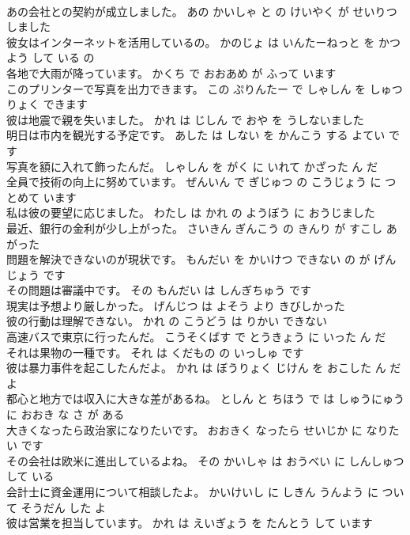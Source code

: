 \documentclass[8pt]{extreport}
\begin{document}
\begin{CJK}{UTF8}{min}
\\	あの会社との契約が成立しました。	あの かいしゃ と の けいやく が せいりつ しました 
\\	彼女はインターネットを活用しているの。	かのじょ は いんたーねっと を かつよう して いる の 
\\	各地で大雨が降っています。	かくち で おおあめ が ふって います 
\\	このプリンターで写真を出力できます。	この ぷりんたー で しゃしん を しゅつりょく できます 
\\	彼は地震で親を失いました。	かれ は じしん で おや を うしないました 
\\	明日は市内を観光する予定です。	あした は しない を かんこう する よてい です 
\\	写真を額に入れて飾ったんだ。	しゃしん を がく に いれて かざった ん だ 
\\	全員で技術の向上に努めています。	ぜんいん で ぎじゅつ の こうじょう に つとめて います 
\\	私は彼の要望に応じました。	わたし は かれ の ようぼう に おうじました 
\\	最近、銀行の金利が少し上がった。	さいきん ぎんこう の きんり が すこし あがった 
\\	問題を解決できないのが現状です。	もんだい を かいけつ できない の が げんじょう です 
\\	その問題は審議中です。	その もんだい は しんぎちゅう です 
\\	現実は予想より厳しかった。	げんじつ は よそう より きびしかった 
\\	彼の行動は理解できない。	かれ の こうどう は りかい できない 
\\	高速バスで東京に行ったんだ。	こうそくばす で とうきょう に いった ん だ 
\\	それは果物の一種です。	それ は くだもの の いっしゅ です 
\\	彼は暴力事件を起こしたんだよ。	かれ は ぼうりょく じけん を おこした ん だ よ 
\\	都心と地方では収入に大きな差があるね。	としん と ちほう で は しゅうにゅう に おおき な さ が ある 
\\	大きくなったら政治家になりたいです。	おおきく なったら せいじか に なりたい です 
\\	その会社は欧米に進出しているよね。	その かいしゃ は おうべい に しんしゅつ して いる 
\\	会計士に資金運用について相談したよ。	かいけいし に しきん うんよう に ついて そうだん した よ 
\\	彼は営業を担当しています。	かれ は えいぎょう を たんとう して います 

\end{CJK}
\end{document}
